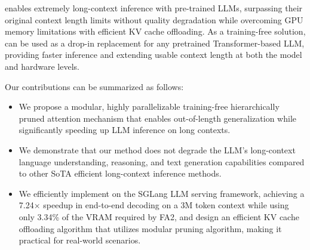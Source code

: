 \ours enables extremely long-context inference with pre-trained LLMs, surpassing their original context length limits without quality degradation while overcoming GPU memory limitations with efficient KV cache offloading. As a training-free solution, \ours can be used as a drop-in replacement for any pretrained Transformer-based LLM, providing faster inference and extending usable context length at both the model and hardware levels.

Our contributions can be summarized as follows:
\vspace{-1.5em}
\begin{itemize}[itemsep=0.5mm, parsep=2pt, leftmargin=12pt]
\item We propose a modular, highly parallelizable training-free hierarchically pruned attention mechanism that enables out-of-length generalization while significantly speeding up LLM inference on long contexts.
\item We demonstrate that our method does not degrade the LLM's long-context language understanding, reasoning, and text generation capabilities compared to other SoTA efficient long-context inference methods.
\item We efficiently implement \ours on the SGLang LLM serving framework, achieving a 7.24$\times$ speedup in end-to-end decoding on a 3M token context while using only 3.34\% of the VRAM required by FA2, and design an efficient KV cache offloading algorithm that utilizes modular pruning algorithm, making it practical for real-world scenarios.
\end{itemize}
